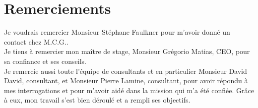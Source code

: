 \section*{Remerciements}
\thispagestyle{empty}
Je voudrais remercier Monsieur Stéphane Faulkner pour m'avoir donné un contact chez M.C.G..\\

Je tiens à remercier mon maître de stage, Monsieur Grégorio Matias, CEO, pour sa confiance et ses conseils. \\


Je remercie aussi toute l'équipe de consultants et en particulier Monsieur David David, consultant, et Monsieur Pierre Lamine, consultant, pour avoir répondu à mes interrogations et pour m'avoir aidé dans la mission qui m'a été confiée. Grâce à eux, mon travail s'est bien déroulé et a rempli ses objectifs.
\clearpage